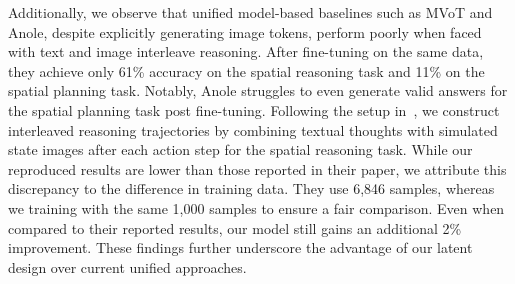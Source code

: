 Additionally, we observe that unified model-based baselines such as MVoT and Anole, despite explicitly generating image tokens, perform poorly when faced with text and image interleave reasoning. After fine-tuning on the same data, they achieve only 61\% accuracy on the spatial reasoning task and 11\% on the spatial planning task. Notably, Anole struggles to even generate valid answers for the spatial planning task post fine-tuning.
Following the setup in~\cite{li2025imagine}, we construct interleaved reasoning trajectories by combining textual thoughts with simulated state images after each action step for the spatial reasoning task. While our reproduced results are lower than those reported in their paper, we attribute this discrepancy to the difference in training data. They use 6,846 samples, whereas we training with the same 1,000 samples to ensure a fair comparison. Even when compared to their reported results, our model still gains an additional 2\% improvement.
These findings further underscore the advantage of our latent design over current unified approaches.



\begin{table}[t]
    \centering
    \caption{\textbf{Experimental Results on COMT, Jigsaw, and SAT tasks.}}
    \label{tab:main-exp-spatial}
\end{table}

